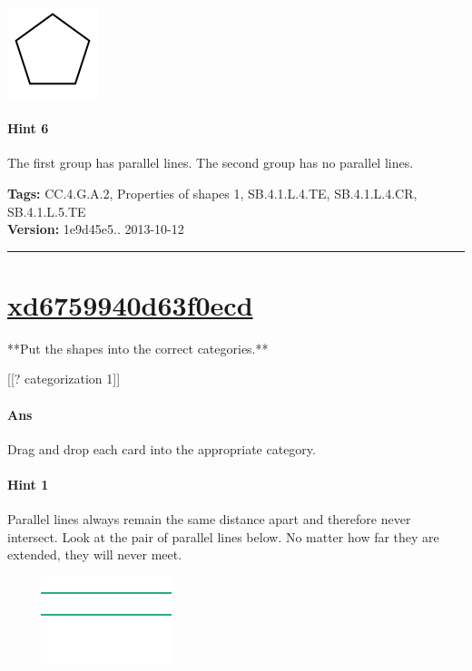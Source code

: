 \documentclass[twocolumn,10pt]{article}
\def\shrinkfactor{0.55}
\begin{document}
\includegraphics[scale=\shrinkfactor]{figures/498a6b09730fdba2360826c138eeee142e8cccc1.png}


\paragraph{Hint 6}The first group has parallel lines.  The second group has no parallel lines.



\medskip
\noindent
\textbf{Tags:} {\footnotesize CC.4.G.A.2, Properties of shapes 1, SB.4.1.L.4.TE, SB.4.1.L.4.CR, SB.4.1.L.5.TE}\\
\textbf{Version:} 1e9d45e5.. 2013-10-12
\smallskip\hrule





\section{\href{https://www.khanacademy.org/devadmin/content/items/xd6759940d63f0ecd}{xd6759940d63f0ecd}}

\noindent
**Put the shapes into the correct categories.**

[[? categorization 1]]


\paragraph{Ans} Drag and drop each card into the appropriate category. 

\paragraph{Hint 1}Parallel lines always remain the same distance apart and therefore never intersect.  Look at the pair of parallel lines below.  No matter how far they are extended, they will never meet.

$\phantom{xxxx}$
\includegraphics[scale=\shrinkfactor]{figures/7cf1fbfb7516a57d37ad80007a3886c81c33f393.png}
\end{document}
